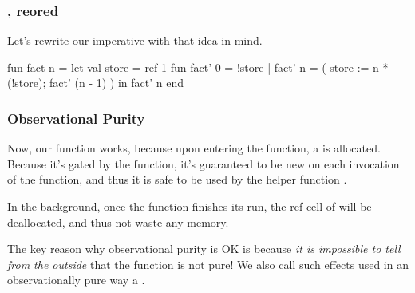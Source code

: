 \documentclass[aspectratio=169]{beamer}
\begin{document}
\begin{frame}[fragile]
  \frametitle{, reored}

  Let's rewrite our imperative  with that idea in mind.

  \pause
  \vspace{\fill}

  \begin{codeblock}
    fun fact n =
      let
        val store = ref 1
        fun fact' 0 = !store
          | fact' n =
              ( store := n * (!store);
                fact' (n - 1)
              )
      in
        fact' n
      end
  \end{codeblock}
\end{frame}

\begin{frame}[fragile]
  \frametitle{Observational Purity}

  \ptmt

  Now, our  function works, because upon entering the function, a
   is allocated. Because it's gated by the function, it's guaranteed
  to be new on each invocation of the function, and thus it is
  safe to be used by the helper function .

  \pause
  \vspace{\fill}

  In the background, once the  function finishes its run, the ref
  cell of  will be deallocated, and thus not waste any memory.

  \pause
  \vspace{\fill}


  \pause
  \vspace{\fill}

  The key reason why observational purity is OK is because \textit{it is impossible
  to tell from the outside} that the function is not pure! We also call such
  effects used in an observationally pure way a .
\end{frame}

\end{document}
